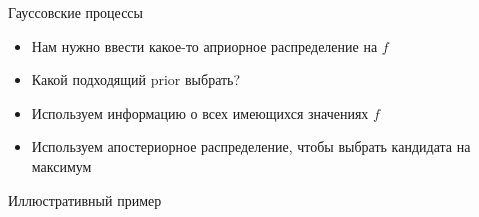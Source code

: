 \documentclass[fullscreen=true, bookmarks=true, hyperref={pdfencoding=unicode}]{beamer}
\begin{document}
\begin{frame}{Гауссовские процессы}

    \begin{itemize}
        \item<1-> Нам нужно ввести какое-то априорное распределение на $f$
        \item<2-> Какой подходящий prior выбрать? 
        \item<4-> Используем информацию о всех имеющихся значениях $f$
        \item<5-> Используем апостериорное распределение, чтобы выбрать кандидата на максимум
    \end{itemize}

\end{frame}

\begin{frame}{Иллюстративный пример}
\end{frame}
\end{document}
